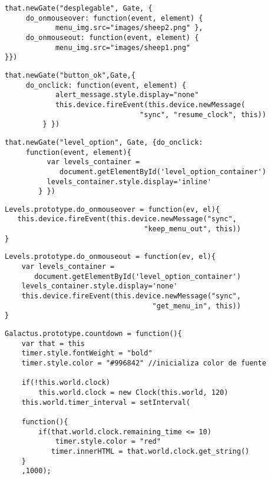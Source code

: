 \begin{lstlisting}[caption=newGate desplegable, label={lst:code5232}]
that.newGate("desplegable", Gate, {
     do_onmouseover: function(event, element) {
            menu_img.src="images/sheep2.png" },
     do_onmouseout: function(event, element) {
            menu_img.src="images/sheep1.png"
}})
\end{lstlisting}

\begin{lstlisting}[caption=newGate button\_ok, label={lst:code5233}]
that.newGate("button_ok",Gate,{
     do_onclick: function(event, element) {
            alert_message.style.display="none"
            this.device.fireEvent(this.device.newMessage(
                                "sync", "resume_clock", this))
         } })
\end{lstlisting}         

\begin{lstlisting}[caption=level\_option, label={lst:code5241}]
that.newGate("level_option", Gate, {do_onclick: 
     function(event, element){
          var levels_container = 
             document.getElementById('level_option_container')
          levels_container.style.display='inline'
        } })
\end{lstlisting}

\begin{lstlisting}[caption=do\_onmouseover, label={lst:code5251}]
Levels.prototype.do_onmouseover = function(ev, el){
   this.device.fireEvent(this.device.newMessage("sync",
                                 "keep_menu_out", this))
}
\end{lstlisting}

\begin{lstlisting}[caption=do\_onmouseout, label={lst:code5252}]
Levels.prototype.do_onmouseout = function(ev, el){
    var levels_container = 
       document.getElementById('level_option_container')
    levels_container.style.display='none'
    this.device.fireEvent(this.device.newMessage("sync",
                                   "get_menu_in", this))
}
\end{lstlisting}

\begin{lstlisting}[caption=do\_onmouseout, label={lst:code531}]
Galactus.prototype.countdown = function(){    
    var that = this
    timer.style.fontWeight = "bold"
    timer.style.color = "#996842" //inicializa color de fuente

    if(!this.world.clock)
        this.world.clock = new Clock(this.world, 120)
    this.world.timer_interval = setInterval(
    
    function(){
        if(that.world.clock.remaining_time <= 10)
            timer.style.color = "red"
           timer.innerHTML = that.world.clock.get_string()
    }    
    ,1000);
\end{lstlisting}